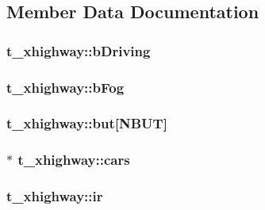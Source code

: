 \subsection{\-Member \-Data \-Documentation}
\hypertarget{structt__xhighway_ae56749819464e36a8cc14e058c16d2a5}{
\subsubsection[{b\-Driving}]{ {\bf t\-\_\-xhighway\-::b\-Driving}}}\label{structt__xhighway_ae56749819464e36a8cc14e058c16d2a5}
\hypertarget{structt__xhighway_adfb032a0d0f1884d9d2038304a9f44aa}{
\subsubsection[{b\-Fog}]{ {\bf t\-\_\-xhighway\-::b\-Fog}}}\label{structt__xhighway_adfb032a0d0f1884d9d2038304a9f44aa}
\hypertarget{structt__xhighway_a2089ec09b9068e576b5377eedf424157}{
\subsubsection[{but}]{ {\bf t\-\_\-xhighway\-::but}\mbox{[}{\bf \-N\-B\-U\-T}\mbox{]}}}\label{structt__xhighway_a2089ec09b9068e576b5377eedf424157}
\hypertarget{structt__xhighway_a7fece9aba1680c11cd8e8307ec217017}{
\subsubsection[{cars}]{$\ast$ {\bf t\-\_\-xhighway\-::cars}}}\label{structt__xhighway_a7fece9aba1680c11cd8e8307ec217017}
\hypertarget{structt__xhighway_ad79cb52e80acaec9f25169b46610e238}{
\subsubsection[{ir}]{ {\bf t\-\_\-xhighway\-::ir}}}\label{structt__xhighway_ad79cb52e80acaec9f25169b46610e238}
